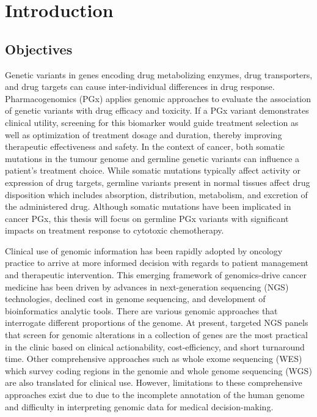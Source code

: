 
\chapter{Introduction}
\label{ch:Introduction}

\section{Objectives}
\label{sec:Objectives}

Genetic variants in genes encoding drug metabolizing enzymes, drug transporters, and drug targets can cause inter-individual differences in drug response. Pharmacogenomics (PGx) applies genomic approaches to evaluate the association of genetic variants with drug efficacy and toxicity. If a PGx variant demonstrates clinical utility, screening for this biomarker would guide treatment selection as well as optimization of treatment dosage and duration, thereby improving therapeutic effectiveness and safety. In the context of cancer, both somatic mutations in the tumour genome and germline genetic variants can influence a patient's treatment choice. While somatic mutations typically affect activity or expression of drug targets, germline variants present in normal tissues affect drug disposition which includes absorption, distribution, metabolism, and excretion of the administered drug. Although somatic mutations have been implicated in cancer PGx, this thesis will focus on germline PGx variants with significant impacts on treatment response to cytotoxic chemotherapy.

Clinical use of genomic information has been rapidly adopted by oncology practice to arrive at more informed decision with regards to patient management and therapeutic intervention. This emerging framework of genomics-drive cancer medicine has been driven by advances in next-generation sequencing (NGS) technologies, declined cost in genome sequencing, and development of bioinformatics analytic tools. There are various genomic approaches that interrogate different proportions of the genome. At present, targeted NGS panels that screen for genomic alterations in a collection of genes are the most practical in the clinic based on clinical actionability, cost-efficiency, and short turnaround time. Other comprehensive approaches such as whole exome sequencing (WES) which survey coding regions in the genomie and whole genome sequencing (WGS) are also translated for clinical use. However, limitations to these comprehensive approaches exist due to due to the incomplete annotation of the human genome and difficulty in interpreting genomic data for medical decision-making.

